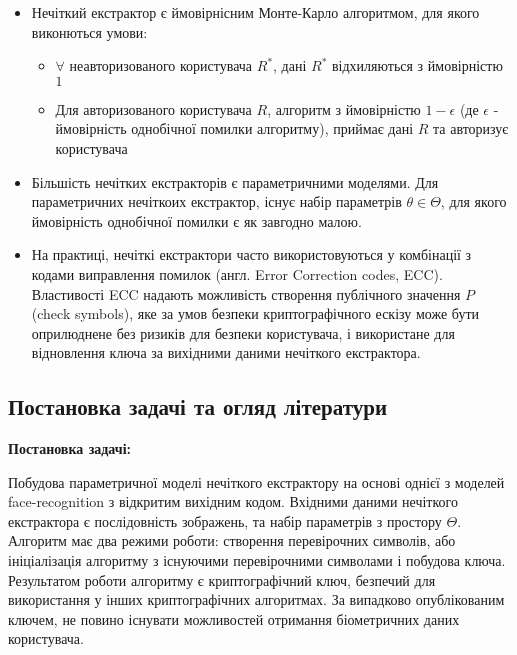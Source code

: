 \documentclass[11pt]{article}
\providecommand{\tightlist}{%
      \setlength{\itemsep}{0pt}\setlength{\parskip}{0pt}}
\begin{document}
\begin{itemize}
\item
  Нечіткий екстрактор є ймовірнісним Монте-Карло алгоритмом, для якого
  виконються умови:

  \begin{itemize}
  \tightlist
  \item
    \(\forall\) неавторизованого користувача \(R^*\), дані \(R^*\) відхиляються  з ймовірністю
    \(1\)
  \item
    Для авторизованого користувача \(R\), алгоритм з ймовірністю
    \(1-\epsilon\) (де \(\epsilon\) - ймовірність однобічної помилки
    алгоритму), приймає дані \(R\) та авторизує користувача
  \end{itemize}
\item
  Більшість нечітких екстракторів є параметричними моделями. Для параметричних нечіткоих екстрактор, існує набір параметрів \(\theta \in \Theta\), для якого
  ймовірність однобічної помилки є як завгодно малою.
\item
  На практиці, нечіткі екстрактори часто використовуються у комбінації з кодами виправлення
  помилок (англ. Error Correction codes, ECC). Властивості ECC надають
  можливість створення публічного значення \(P\) (check symbols), яке
  за умов безпеки криптографічного ескізу може бути оприлюднене без ризиків для безпеки користувача, і
  використане для відновлення ключа за вихідними даними нечіткого
  екстрактора.
\end{itemize}
\vspace{15ex}
    \hypertarget{ux43fux43eux441ux442ux430ux43dux43eux432ux43aux430-ux437ux430ux434ux430ux447ux456-ux442ux430-ux43eux433ux43bux44fux434-ux43bux456ux442ux435ux440ux430ux442ux443ux440ux438}{%
\subsection{Постановка задачі та огляд
літератури}\label{ux43fux43eux441ux442ux430ux43dux43eux432ux43aux430-ux437ux430ux434ux430ux447ux456-ux442ux430-ux43eux433ux43bux44fux434-ux43bux456ux442ux435ux440ux430ux442ux443ux440ux438}}

\bf{Постановка задачі:}
\normalfont

Побудова параметричної моделі нечіткого екстрактору на основі однієї з
моделей face-recognition з відкритим вихідним кодом. Вхідними даними
нечіткого екстрактора є послідовність зображень, та набір параметрів з
простору \(\Theta\). Алгоритм має два режими роботи: створення
перевірочних символів, або ініціалізація алгоритму з існуючими
перевірочними символами і побудова ключа. Результатом роботи алгоритму є
криптографічний ключ, безпечий для використання у інших криптографічних
алгоритмах. За випадково опублікованим ключем, не повино існувати
можливостей отримання біометричних даних користувача.
\end{document}

